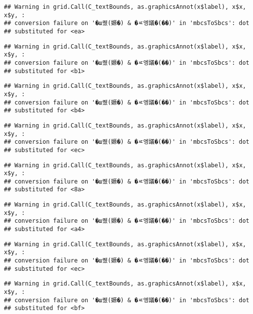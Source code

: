 \documentclass[
]{article}
\begin{document}
\begin{verbatim}
## Warning in grid.Call(C_textBounds, as.graphicsAnnot(x$label), x$x, x$y, :
## conversion failure on '�ш퀬(嫄�) & �ㅼ엥議�(��)' in 'mbcsToSbcs': dot
## substituted for <ea>
\end{verbatim}

\begin{verbatim}
## Warning in grid.Call(C_textBounds, as.graphicsAnnot(x$label), x$x, x$y, :
## conversion failure on '�ш퀬(嫄�) & �ㅼ엥議�(��)' in 'mbcsToSbcs': dot
## substituted for <b1>
\end{verbatim}

\begin{verbatim}
## Warning in grid.Call(C_textBounds, as.graphicsAnnot(x$label), x$x, x$y, :
## conversion failure on '�ш퀬(嫄�) & �ㅼ엥議�(��)' in 'mbcsToSbcs': dot
## substituted for <b4>
\end{verbatim}

\begin{verbatim}
## Warning in grid.Call(C_textBounds, as.graphicsAnnot(x$label), x$x, x$y, :
## conversion failure on '�ш퀬(嫄�) & �ㅼ엥議�(��)' in 'mbcsToSbcs': dot
## substituted for <ec>
\end{verbatim}

\begin{verbatim}
## Warning in grid.Call(C_textBounds, as.graphicsAnnot(x$label), x$x, x$y, :
## conversion failure on '�ш퀬(嫄�) & �ㅼ엥議�(��)' in 'mbcsToSbcs': dot
## substituted for <8a>
\end{verbatim}

\begin{verbatim}
## Warning in grid.Call(C_textBounds, as.graphicsAnnot(x$label), x$x, x$y, :
## conversion failure on '�ш퀬(嫄�) & �ㅼ엥議�(��)' in 'mbcsToSbcs': dot
## substituted for <a4>
\end{verbatim}

\begin{verbatim}
## Warning in grid.Call(C_textBounds, as.graphicsAnnot(x$label), x$x, x$y, :
## conversion failure on '�ш퀬(嫄�) & �ㅼ엥議�(��)' in 'mbcsToSbcs': dot
## substituted for <ec>
\end{verbatim}

\begin{verbatim}
## Warning in grid.Call(C_textBounds, as.graphicsAnnot(x$label), x$x, x$y, :
## conversion failure on '�ш퀬(嫄�) & �ㅼ엥議�(��)' in 'mbcsToSbcs': dot
## substituted for <bf>
\end{verbatim}
\end{document}
